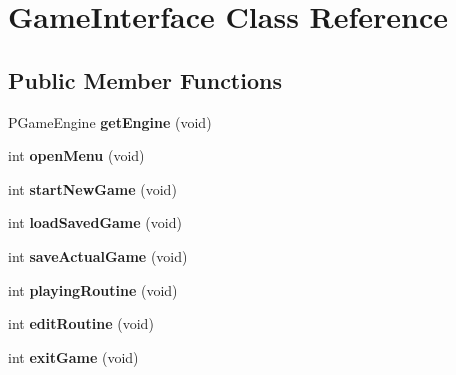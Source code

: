 \hypertarget{classGameInterface}{}\section{Game\+Interface Class Reference}
\label{classGameInterface}
\subsection*{Public Member Functions}
\begin{DoxyCompactItemize}
\item 
P\+Game\+Engine {\bfseries get\+Engine} (void)\hypertarget{classGameInterface_a0d60098b2f94bb20efb20196904dc30b}{}\label{classGameInterface_a0d60098b2f94bb20efb20196904dc30b}

\item 
int {\bfseries open\+Menu} (void)\hypertarget{classGameInterface_a19dc01c2f82f5140e56980f5c02a8f55}{}\label{classGameInterface_a19dc01c2f82f5140e56980f5c02a8f55}

\item 
int {\bfseries start\+New\+Game} (void)\hypertarget{classGameInterface_a8a65a71277e660b053441c6bccdd21b9}{}\label{classGameInterface_a8a65a71277e660b053441c6bccdd21b9}

\item 
int {\bfseries load\+Saved\+Game} (void)\hypertarget{classGameInterface_a1fe1e9abc88b994338f22202dae74a29}{}\label{classGameInterface_a1fe1e9abc88b994338f22202dae74a29}

\item 
int {\bfseries save\+Actual\+Game} (void)\hypertarget{classGameInterface_ae069b22415177addad2bd7999b9eb2d9}{}\label{classGameInterface_ae069b22415177addad2bd7999b9eb2d9}

\item 
int {\bfseries playing\+Routine} (void)\hypertarget{classGameInterface_ac64abd0ec216c442a4cae4d09f94ab0a}{}\label{classGameInterface_ac64abd0ec216c442a4cae4d09f94ab0a}

\item 
int {\bfseries edit\+Routine} (void)\hypertarget{classGameInterface_a72f37e45597b372fdbe895c9f8f61fe3}{}\label{classGameInterface_a72f37e45597b372fdbe895c9f8f61fe3}

\item 
int {\bfseries exit\+Game} (void)\hypertarget{classGameInterface_ab0ded12c364ac64a8362959608201b98}{}\label{classGameInterface_ab0ded12c364ac64a8362959608201b98}


\end{DoxyCompactItemize}
